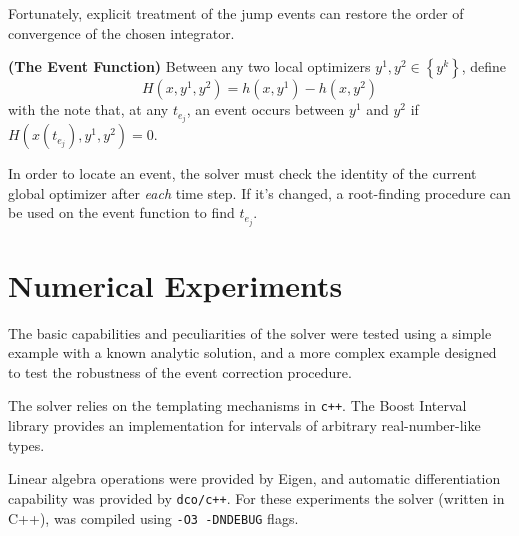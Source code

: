 \documentclass[twoside,leqno, twocolumn]{article}
\begin{document}
Fortunately, explicit treatment of the jump events can restore the order of convergence of the chosen integrator.
\begin{Definition}
	\label{def:event-fn}
	\textbf{(The Event Function)}
	Between any two local optimizers $y^1, y^2 \in \left\{y^k\right\}$, define
	\begin{equation*}
		H(x, y^1, y^2) = h(x, y^1) - h(x, y^2)
	\end{equation*}
	with the note that, at any $t_{e_j}$, an event occurs between $y^1$ and $y^2$ if $H\left(x(t_{e_j}), y^1, y^2\right) = 0$.
\end{Definition}
In order to locate an event, the solver must check the identity of the current global optimizer after \textit{each} time step. If it's changed, a root-finding procedure can be used on the event function to find $t_{e_j}$.


\section{Numerical Experiments}
\label{section:numerical-experiments}
The basic capabilities and peculiarities of the solver were tested using a simple example with a known analytic solution, and a more complex example designed to test the robustness of the event correction procedure. 

The solver relies on the templating mechanisms in \texttt{c++}. The Boost Interval library \cite{melquiondBoostIntervalLibrary2022} provides an implementation for intervals of arbitrary real-number-like types.

Linear algebra operations were provided by Eigen\cite{guennebaudEigenV32010}, and automatic differentiation capability was provided by \texttt{dco/c++}\cite{leppkesDerivativeCodeOverloading2016}. For these experiments the solver (written in C++), was compiled using \texttt{-O3 -DNDEBUG} flags.
\end{document}
